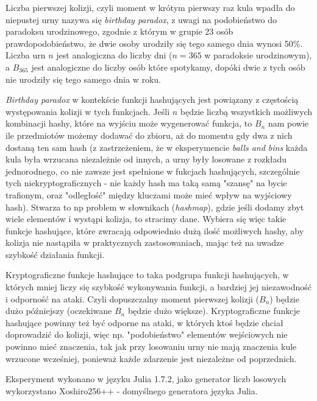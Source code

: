 \documentclass{article}
\begin{document}
Liczba pierwszej kolizji, czyli moment w krótym pierwszy raz kula wpadła do niepustej urny nazywa się \textit{birthday paradox}, z uwagi na podobieństwo do paradoksu urodzinowego, zgodnie z którym w grupie 23 osób prawdopodobieństwo, że dwie osoby urodziły się tego samego dnia wynosi 50\%. Liczba urn $n$ jest analogiczna do liczby dni ($n=365$ w paradoksie urodzinowym), a $B_{365}$ jest analogiczne do liczby osób które spotykamy, dopóki dwie z tych osób nie urodziły się tego samego dnia w roku.

\textit{Birthday paradox} w kontekście funkcji hashujących jest powiązany z częstością występowania kolizji w tych funkcjach. Jeśli $n$ będzie liczbą wszystkich możliwych kombinacji hashy, które na wyjściu może wygenerować funkcja, to $B_n$ nam powie ile przedmiotów możemy dodawać do zbioru, aż do momentu gdy dwa z nich dostaną ten sam hash (z zastrzeżeniem, że w eksperymencie \textit{balls and bins} każda kula była wrzucana niezależnie od innych, a urny były losowane z rozkładu jednorodnego, co nie zawsze jest spełnione w fukcjach hashujących, szczególnie tych niekryptograficznych - nie każdy hash ma taką samą "szansę" na bycie trafionym, oraz "odległość" między kluczami może mieć wpływ na wyjściowy hash). Stwarza to np problem w słownikach (\textit{hashmap}), gdzie jeśli dodamy zbyt wiele elementów i wystąpi kolizja, to stracimy dane. Wybiera się więc takie funkcje hashujące, które zwracają odpowiednio dużą ilość możliwych hashy, aby kolizja nie nastąpiła w praktycznych zastosowaniach, mając też na uwadze szybkość działania funkcji.

Kryptograficzne funkcje hashujące to taka podgrupa funkcji hashujących, w których mniej liczy się szybkość wykonywania funkcji, a bardziej jej niezawodność i odporność na ataki. Czyli dopuszczalny moment pierwszej kolizji ($B_n$) będzie dużo późniejszy (oczekiwane $B_n$ będzie dużo większe). Kryptograficzne funkcje hashujące powinny też być odporne na ataki, w których ktoś będzie chciał doprowadzić do kolizji, więc np. "podobieństwo" elementów wejściowych nie powinno mieć znaczenia, tak jak przy losowaniu urny nie mają znaczenia kule wrzucone wcześniej, ponieważ każde zdarzenie jest niezależne od poprzednich.



Eksperyment wykonano w języku Julia 1.7.2, jako generator liczb losowych wykorzystano Xoshiro256++ - domyślnego generatora języka Julia.
\end{document}
